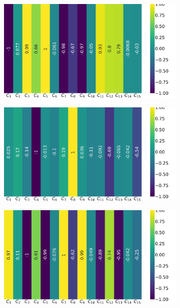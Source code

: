 \begin{figure}[!ht]
	\centering
	\begin{subfigure}{0.49\linewidth}
		\includegraphics[width=\linewidth]{img/qlp_corr/An_coil0.png}
	\end{subfigure}
	\begin{subfigure}{0.49\linewidth}
		\includegraphics[width=\linewidth]{img/qlp_corr/An_coil1.png}
	\end{subfigure}
	\begin{subfigure}{0.49\linewidth}
		\includegraphics[width=\linewidth]{img/qlp_corr/An_coil2.png}

\end{subfigure}
\end{figure}
